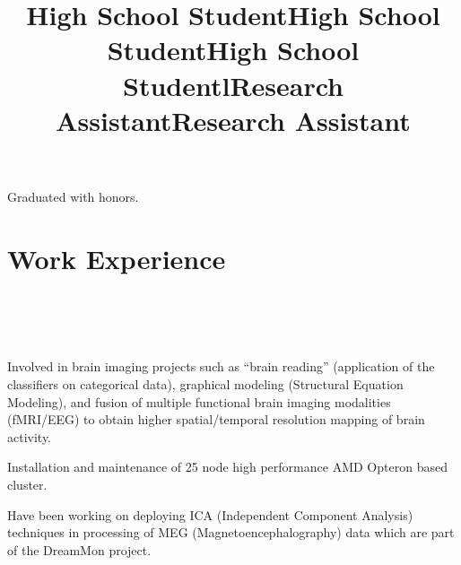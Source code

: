\documentclass[10pt,overlapped,line]{res}
\begin{document}
\begin{resume}
 \title{High School Student}
 \begin{position}
  Graduated with honors.
 \end{position}

 \title{High School Student}
 \begin{position}
 \end{position}

 \title{High School Student}
 \begin{position}
 \end{position}

 \section{Work Experience}
 \begin{format}
   \title{l}\\
   \\
   \body\\
 \end{format}

 \title{Research Assistant}
 \begin{position}
   Involved in brain imaging projects such as ``brain reading''
   (application of the classifiers on categorical data), graphical
   modeling (Structural Equation Modeling), and fusion of multiple
   functional brain imaging modalities (f{MRI}/{EEG}) to obtain higher
   spatial/temporal resolution mapping of brain activity.

   Installation and maintenance of 25 node high performance {AMD}
   {O}pteron based cluster.
 \end{position}

 \title{Research Assistant}
 \begin{position}
   Have been working  on deploying ICA (Independent Component
   Analysis) techniques in processing of MEG (Magnetoencephalography)
   data which are part of the DreamMon project.


\end{position}
\end{resume}
\end{document}
